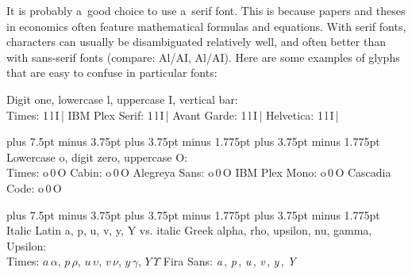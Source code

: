 \documentclass[12pt, a4paper, oneside]{article}
\newlength{\baselinedist}
\newlength{\smalllinespacing}
\newlength{\fsnormal}
\newlength{\fssmall}
\let \normalsizeOrig \normalsize
\let \smallOrig \small
\def\normalsize{%
		\normalsizeOrig%
		\fontsize{\fsnormal}{\baselinedist}\selectfont%
		\abovedisplayskip 13.5pt plus 6.75pt minus 3.375pt%
		\belowdisplayskip \abovedisplayskip%
		\abovedisplayshortskip 6.75pt plus 3.375pt minus 1.6875pt%
		\belowdisplayshortskip 6.75pt plus 3.375pt minus 1.6875pt%
	}
\def\normalsize{%
		\normalsizeOrig%
		\fontsize{\fsnormal}{\baselinedist}\selectfont%
		\abovedisplayskip 15pt plus 7.5pt minus 3.75pt%
		\belowdisplayskip \abovedisplayskip%
		\abovedisplayshortskip 7.5pt plus 3.75pt minus 1.775pt%
		\belowdisplayshortskip 7.5pt plus 3.75pt minus 1.775pt%
	}
\renewcommand{\small}{\smallOrig\fontsize{\fssmall}{\smalllinespacing}\selectfont}
\theoremstyle{Plain}
\theoremstyle{Definition}
\theoremstyle{Remark}
\begin{document}
It is probably a~good choice to use a~serif font. This is because papers and theses in economics often feature mathematical formulas and equations. With serif fonts, characters can usually be disambiguated relatively well, and often better than with sans-serif fonts (compare: Al/AI, {\selectfont Al/AI}). Here are some examples of glyphs that are easy to confuse in particular fonts:
\begin{tcolorbox}[before upper = {\setlength{\parindent}{0pt}\setlength{\parskip}{\medskipamount}\strut}]
	Digit one, lowercase l, uppercase I, vertical bar: \\
	\small%
	{\selectfont Times: 1\,l\,I\,|} \quad
	{\selectfont IBM Plex Serif: 1\,l\,I\,|} \quad
	{\selectfont Avant Garde: 1\,l\,I\,|} \quad
	{\selectfont Helvetica: 1\,l\,I\,|} 
	\par
	\normalsize%
	Lowercase o, digit zero, uppercase O: \\
	\small%
	{\selectfont Times: o\,0\,O}\quad
	{\selectfont Cabin: o\,0\,O}\quad
	{\selectfont Alegreya Sans: o\,0\,O}\quad
	{\selectfont IBM Plex Mono: o\,0\,O}\quad
	{\selectfont Cascadia Code: o\,0\,O}
	\par
	\normalsize%
	Italic Latin a, p, u, v, y, Y vs. italic Greek alpha, rho, upsilon, nu, gamma, Upsilon: \\
	\small%
	Times: $a \, \alpha$, $p \, \rho$, $u \, \upsilon$, $v \, \nu$, $y \, \gamma$, $Y \, \mathit{\Upsilon}$
	\quad
	{\selectfont Fira Sans: {\itshape a\,\textalpha}, {\itshape p\,\textrho}, {\itshape u\,\textupsilon}, {\itshape v\,\textnu}, {\itshape y\,\textgamma}, {\itshape Y\,\textUpsilon}}
\end{tcolorbox}
\end{document}

